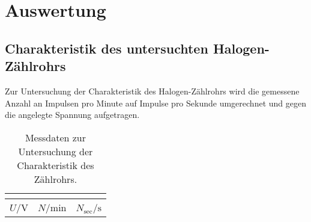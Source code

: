 \section{Auswertung}
\label{sec:Auswertung}
\subsection{Charakteristik des untersuchten Halogen-Zählrohrs}
Zur Untersuchung der Charakteristik des Halogen-Zählrohrs wird die gemessene Anzahl an Impulsen pro Minute auf Impulse pro Sekunde umgerechnet und gegen die angelegte Spannung aufgetragen.


\begin{longtable}{ccc}
  \caption{Messdaten zur Untersuchung der Charakteristik des Zählrohrs.}\\
  \label{tab:atab}\\
\toprule
$U$/$\si{\volt}$ &$N$/$\si{\minute}$&$N_\mathrm{sec}$/$\si{\second}$ \\


\end{longtable}
